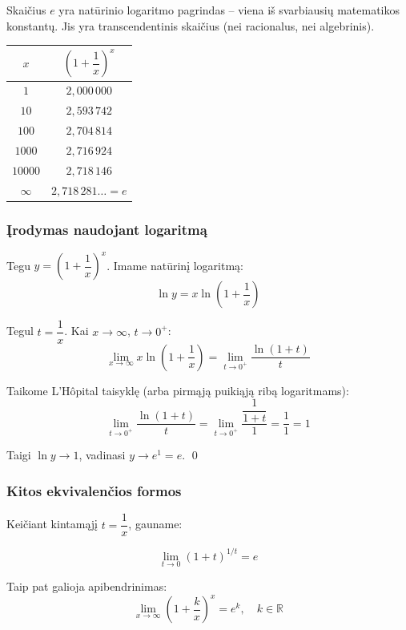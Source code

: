Skaičius $e$ yra natūrinio logaritmo pagrindas – viena iš svarbiausių matematikos konstantų. Jis yra transcendentinis skaičius (nei racionalus, nei algebrinis).

\begin{center}
\begin{tabular}{|c|c|}
\hline
$x$ & $\left(1 + \dfrac{1}{x}\right)^x$ \\
\hline
$1$      & $2{,}000\,000$ \\
$10$     & $2{,}593\,742$ \\
$100$    & $2{,}704\,814$ \\
$1000$   & $2{,}716\,924$ \\
$10000$  & $2{,}718\,146$ \\
$\infty$ & $2{,}718\,281\ldots = e$ \\
\hline
\end{tabular}
\end{center}

\subsubsection*{Įrodymas naudojant logaritmą}

Tegu $y = \left(1 + \dfrac{1}{x}\right)^x$. Imame natūrinį logaritmą:
\[
  \ln y = x \ln\!\left(1 + \frac{1}{x}\right)
\]

Tegul $t = \dfrac{1}{x}$. Kai $x \to \infty$, $t \to 0^+$:
\[
  \lim_{x \to \infty} x \ln\!\left(1 + \frac{1}{x}\right)
  = \lim_{t \to 0^+} \frac{\ln(1 + t)}{t}
\]

Taikome L'Hôpital taisyklę (arba pirmąją puikiąją ribą logaritmams):
\[
  \lim_{t \to 0^+} \frac{\ln(1 + t)}{t}
  = \lim_{t \to 0^+} \frac{\dfrac{1}{1+t}}{1}
  = \frac{1}{1} = 1
\]

Taigi $\ln y \to 1$, vadinasi $y \to e^1 = e$. \qed

\subsubsection*{Kitos ekvivalenčios formos}

Keičiant kintamąjį $t = \dfrac{1}{x}$, gauname:

\begin{tcolorbox}[colback=yellow!5!white, colframe=orange!70!black, title=Lygiavertė forma]
\[
  \lim_{t \to 0} (1 + t)^{1/t} = e
\]
\end{tcolorbox}

Taip pat galioja apibendrinimas:
\[
  \lim_{x \to \infty} \left(1 + \frac{k}{x}\right)^x = e^k, \quad k \in \mathbb{R}
\]

